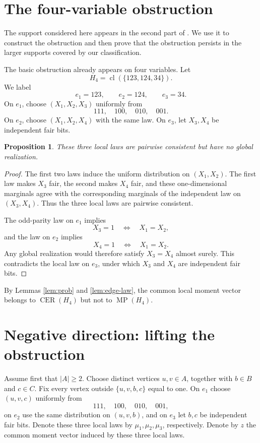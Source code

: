 \documentclass[11pt]{article}
\newtheorem{proposition}[theorem]{Proposition}
\theoremstyle{definition}
\theoremstyle{remark}
\newcommand{\cl}{\operatorname{cl}}
\newcommand{\MP}{\operatorname{MP}}
\newcommand{\CER}{\operatorname{CER}}
\begin{document}
\section{The four-variable obstruction}\label{sec:H4}
\begin{editedaiblock}

The support considered here appears in the second part of
\cite[Example 1]{delpia2026cer}. We use it to construct the obstruction
and then prove that the obstruction persists in the larger supports
covered by our classification.

The basic obstruction already appears on four variables. Let
\[
H_4=\cl(\{123,124,34\}).
\]
We label
\[
e_1=123,\qquad e_2=124,\qquad e_3=34.
\]
On $e_1$, choose $(X_1,X_2,X_3)$ uniformly from
\[
111,\quad100,\quad010,\quad001.
\]
On $e_2$, choose $(X_1,X_2,X_4)$ with the same law. On $e_3$, let $X_3,X_4$ be independent fair bits.

\begin{proposition}\label{prop:H4}
These three local laws are pairwise consistent but have no global realization.
\end{proposition}

\begin{proof}
The first two laws induce the uniform distribution on $(X_1,X_2)$. The first law makes $X_3$ fair, the second makes $X_4$ fair, and these one-dimensional marginals agree with the corresponding marginals of the independent law on $(X_3,X_4)$. Thus the three local laws are pairwise consistent.

The odd-parity law on $e_1$ implies
\[
X_3=1\quad\Longleftrightarrow\quad X_1=X_2,
\]
and the law on $e_2$ implies
\[
X_4=1\quad\Longleftrightarrow\quad X_1=X_2.
\]
Any global realization would therefore satisfy $X_3=X_4$ almost surely. This contradicts the local law on $e_3$, under which $X_3$ and $X_4$ are independent fair bits.
\end{proof}

By Lemmas \ref{lem:prob} and \ref{lem:edge-law}, the common local moment vector belongs to $\CER(H_4)$ but not to $\MP(H_4)$.

\section{Negative direction: lifting the obstruction}\label{sec:negative}

Assume first that $|A|\ge 2$. Choose distinct vertices $u,v\in A$, together with $b\in B$ and $c\in C$. Fix every vertex outside $\{u,v,b,c\}$ equal to one. On $e_1$ choose $(u,v,c)$ uniformly from
\[
111,\quad100,\quad010,\quad001,
\]
on $e_2$ use the same distribution on $(u,v,b)$, and on $e_3$ let $b,c$ be independent fair bits. Denote these three local laws by $\mu_1,\mu_2,\mu_3$, respectively. Denote by $z$ the common moment vector induced by these three local laws.


\end{editedaiblock}
\end{document}
